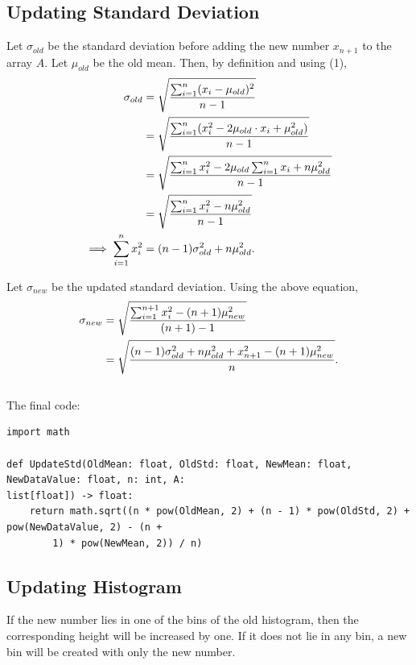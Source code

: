 \documentclass{article}
\begin{document}
\subsection*{Updating Standard Deviation}

Let $\sigma_{old}$ be the standard deviation before adding the new number $x_{n+1}$ to the array $A$. Let $\mu_{old}$ be the old mean. Then, by definition and using (1),
\begin{equation}
    \begin{aligned}
        \sigma_{old} &= \sqrtsign{\dfrac{\sum_{i=1}^{n}(x_i-\mu_{old})^2}{n-1}} \\
        &= \sqrtsign{\dfrac{\sum_{i=1}^{n}(x_i^2-2\mu_{old}\cdot x_i+\mu_{old}^2)}{n-1}} \\
        &= \sqrtsign{\dfrac{\sum_{i=1}^{n}x_i^2 -2\mu_{old}\sum_{i=1}^{n}x_i + n\mu_{old}^2}{n-1}} \\
        &= \sqrtsign{\dfrac{\sum_{i=1}^{n}x_i^2-n\mu_{old}^2}{n-1}} \\
        \implies \sum_{i=1}^{n}x_i^2 &= (n-1)\sigma_{old}^2 + n\mu_{old}^2.
    \end{aligned}
\end{equation}

Let $\sigma_{new}$ be the updated standard deviation. Using the above equation,
\begin{equation}
    \begin{aligned}
        \sigma_{new} &= \sqrtsign{\dfrac{\sum_{i=1}^{n+1}x_i^2-(n+1)\mu_{new}^2}{(n+1)-1}} \\
        &= \sqrtsign{\dfrac{(n-1)\sigma_{old}^2 + n\mu_{old}^2 + x_{n+1}^2-(n+1)\mu_{new}^2}{n}}.
    \end{aligned}
\end{equation}
\\[10pt]
The final code:
\begin{lstlisting}
import math

def UpdateStd(OldMean: float, OldStd: float, NewMean: float, NewDataValue: float, n: int, A:
list[float]) -> float:
    return math.sqrt((n * pow(OldMean, 2) + (n - 1) * pow(OldStd, 2) + pow(NewDataValue, 2) - (n +
        1) * pow(NewMean, 2)) / n)
\end{lstlisting}

\subsection*{Updating Histogram}

If the new number lies in one of the bins of the old histogram, then the corresponding height will be increased by one. If it does not lie in any bin, a new bin will be created with only the new number.
\end{document}
